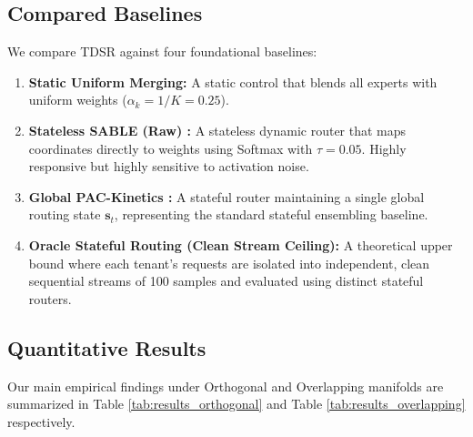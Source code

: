 \subsection{Compared Baselines}
We compare TDSR against four foundational baselines:
\begin{enumerate}
    \item \textbf{Static Uniform Merging:} A static control that blends all experts with uniform weights ($\alpha_k = 1/K = 0.25$).
    \item \textbf{Stateless SABLE (Raw) \cite{liang23sable}:} A stateless dynamic router that maps coordinates directly to weights using Softmax with $\tau = 0.05$. Highly responsive but highly sensitive to activation noise.
    \item \textbf{Global PAC-Kinetics \cite{pac_zca_2026}:} A stateful router maintaining a single global routing state $\mathbf{s}_t$, representing the standard stateful ensembling baseline.
    \item \textbf{Oracle Stateful Routing (Clean Stream Ceiling):} A theoretical upper bound where each tenant's requests are isolated into independent, clean sequential streams of 100 samples and evaluated using distinct stateful routers.
\end{enumerate}

\subsection{Quantitative Results}
Our main empirical findings under Orthogonal and Overlapping manifolds are summarized in Table \ref{tab:results_orthogonal} and Table \ref{tab:results_overlapping} respectively.

